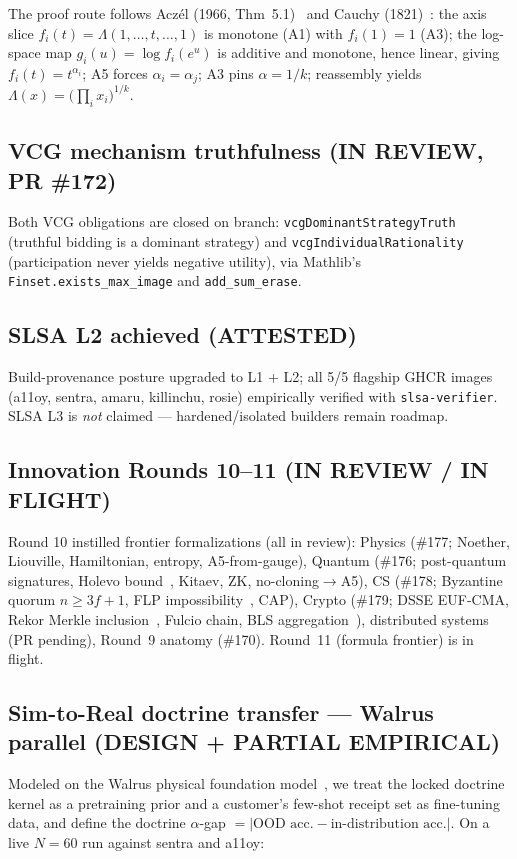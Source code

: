 \documentclass[11pt]{article}
\begin{document}
The proof route follows Acz\'el (1966, Thm~5.1)~\cite{aczel1966} and Cauchy (1821)~\cite{cauchy1821}:
the axis slice $f_i(t)=\Lambda(1,\dots,t,\dots,1)$ is monotone (A1) with $f_i(1)=1$ (A3); the log-space
map $g_i(u)=\log f_i(e^u)$ is additive and monotone, hence linear, giving $f_i(t)=t^{\alpha_i}$; A5 forces
$\alpha_i=\alpha_j$; A3 pins $\alpha=1/k$; reassembly yields $\Lambda(x)=\bigl(\prod_i x_i\bigr)^{1/k}$.

\subsection{VCG mechanism truthfulness (IN REVIEW, PR \#172)}
Both VCG obligations are closed on branch: \texttt{vcgDominantStrategyTruth} (truthful bidding is a
dominant strategy) and \texttt{vcgIndividualRationality} (participation never yields negative utility),
via Mathlib's \texttt{Finset.exists\_max\_image} and \texttt{add\_sum\_erase}.

\subsection{SLSA L2 achieved (ATTESTED)}
Build-provenance posture upgraded to L1 + L2; all 5/5 flagship GHCR images (a11oy, sentra, amaru,
killinchu, rosie) empirically verified with \texttt{slsa-verifier}. SLSA L3 is \emph{not} claimed ---
hardened/isolated builders remain roadmap.

\subsection{Innovation Rounds 10--11 (IN REVIEW / IN FLIGHT)}
Round 10 instilled frontier formalizations (all in review): Physics (\#177; Noether, Liouville,
Hamiltonian, entropy, A5-from-gauge), Quantum (\#176; post-quantum signatures, Holevo
bound~\cite{holevo1973}, Kitaev, ZK, no-cloning$\to$A5), CS (\#178; Byzantine quorum $n\ge 3f+1$,
FLP impossibility~\cite{flp1985}, CAP), Crypto (\#179; DSSE EUF-CMA, Rekor Merkle
inclusion~\cite{rfc6962}, Fulcio chain, BLS aggregation~\cite{bls2001}), distributed systems (PR
pending), Round~9 anatomy (\#170). Round~11 (formula frontier) is in flight.

\subsection{Sim-to-Real doctrine transfer --- Walrus parallel (DESIGN + PARTIAL EMPIRICAL)}
Modeled on the Walrus physical foundation model~\cite{walrus2025}, we treat the locked doctrine kernel
as a pretraining prior and a customer's few-shot receipt set as fine-tuning data, and define the doctrine
$\alpha$-gap $=\lvert\text{OOD acc.}-\text{in-distribution acc.}\rvert$. On a live $N{=}60$ run against
sentra and a11oy:
\end{document}

